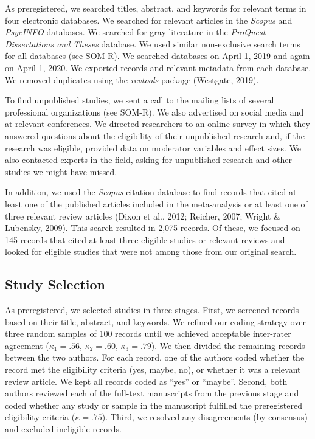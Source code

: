 \documentclass[12pt, letterpaper]{article}
\begin{document}
As preregistered, we searched titles, abstract, and keywords for
relevant terms in four electronic databases. We searched for relevant
articles in the \emph{Scopus} and \emph{PsycINFO} databases. We searched
for gray literature in the \emph{ProQuest Dissertations and Theses}
database. We used similar non-exclusive search terms for all databases
(see SOM-R). We searched databases on April 1, 2019 and again on April
1, 2020. We exported records and relevant metadata from each database.
We removed duplicates using the \emph{revtools} package (Westgate,
2019).

To find unpublished studies, we sent a call to the mailing lists of
several professional organizations (see SOM-R). We also advertised on
social media and at relevant conferences. We directed researchers to an
online survey in which they answered questions about the eligibility of
their unpublished research and, if the research was eligible, provided
data on moderator variables and effect sizes. We also contacted experts
in the field, asking for unpublished research and other studies we might
have missed.

In addition, we used the \emph{Scopus} citation database to find records
that cited at least one of the published articles included in the
meta-analysis or at least one of three relevant review articles (Dixon
et al., 2012; Reicher, 2007; Wright \& Lubensky, 2009). This search
resulted in 2,075 records. Of these, we focused on 145 records that
cited at least three eligible studies or relevant reviews and looked for
eligible studies that were not among those from our original search.

\hypertarget{study-selection}{%
\subsection{Study Selection}\label{study-selection}}

As preregistered, we selected studies in three stages. First, we
screened records based on their title, abstract, and keywords. We
refined our coding strategy over three random samples of 100 records
until we achieved acceptable inter-rater agreement (\(\kappa_1 = .56\),
\(\kappa_2 = .60\), \(\kappa_3 = .79\)). We then divided the remaining
records between the two authors. For each record, one of the authors
coded whether the record met the eligibility criteria (yes, maybe, no),
or whether it was a relevant review article. We kept all records coded
as ``yes'' or ``maybe''. Second, both authors reviewed each of the
full-text manuscripts from the previous stage and coded whether any
study or sample in the manuscript fulfilled the preregistered
eligibility criteria (\(\kappa = .75\)). Third, we resolved any
disagreements (by consensus) and excluded ineligible records.
\end{document}
